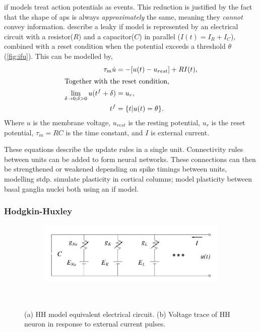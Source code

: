 \acrshort{if} models treat action potentials as events.
This reduction is justified by the fact that the shape of \acrshort{ap}s is always \textit{approximately}
the same, meaning they \textit{cannot} convey information. \cite{gerstner2014if} describe a leaky \acrshort{if} model
is represented by an electrical circuit with a resistor($R$) and a capacitor($C$) in parallel
($I(t) = I_R + I_C$), combined with a reset condition when the potential exceeds a threshold
$\theta$ (\cref{fig:ifu}).
This can be modelled by,
\begin{align}
	\tau_m \dot u                                           & = -[u(t) - u_{rest}] + RI(t),                                    \\
	\intertext{Together with the reset condition,}
	\lim_{\delta \rightarrow 0; \delta > 0} u(t^f + \delta) & = u_r,                                                           \\
	t^f                                                     & = \{t | u(t)                                        = \theta \}.
\end{align}
Where $u$ is the membrane voltage, $u_{rest}$ is the resting potential, $u_r$ is the reset
potential, $\tau_m = RC$ is the time constant, and $I$ is external current.

These equations describe the update rules in a single unit. Connectivity rules between units
can be added to form neural networks. These connections can then be strengthened or weakened
depending on spike timings between units, modelling \acrshort{stdp}. \cite{shupe2021integrate} simulate
plasticity in cortical columns; \cite{kromer2023synaptic} model plasticity between basal ganglia
nuclei both using an \acrshort{if} model.

\subsubsection{Hodgkin-Huxley}

\begin{figure}[ht]
	\centering
	\begin{subfigure}[t]{0.45\textwidth}
		\caption{}
		\hspace{-5mm}
		\includegraphics[height=1.2in]{figs/hh_circuit}
		\label{fig:hhcirc}
	\end{subfigure}
	~
	\begin{subfigure}[t]{0.45\textwidth}
		\caption{}
		\hspace{8mm}
		
		\label{fig:hhu}
	\end{subfigure}
	\caption{(a) HH model equivalent electrical circuit. (b) Voltage trace of HH neuron in response to external current pulses.}
	\label{fig:hh}
\end{figure}

